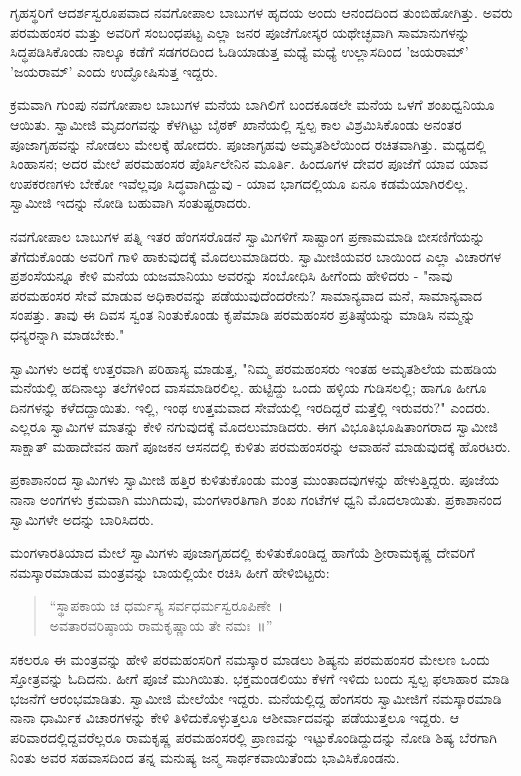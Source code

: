 ಗೃಹಸ್ಥರಿಗೆ ಆದರ್ಶಸ್ವರೂಪವಾದ ನವಗೋಪಾಲ ಬಾಬುಗಳ ಹೃದಯ ಅಂದು ಆನಂದದಿಂದ ತುಂಬಿಹೋಗಿತ್ತು. ಅವರು ಪರಮಹಂಸರ ಮತ್ತು ಅವರಿಗೆ ಸಂಬಂಧಪಟ್ಟ ಎಲ್ಲಾ ಜನರ ಪೂಜೆಗೋಸ್ಕರ ಯಥೇಚ್ಛವಾಗಿ ಸಾಮಾನುಗಳನ್ನು ಸಿದ್ಧಪಡಿಸಿಕೊಂಡು ನಾಲ್ಕೂ ಕಡೆಗೆ ಸಡಗರದಿಂದ ಓಡಿಯಾಡುತ್ತ ಮಧ್ಯೆ ಮಧ್ಯೆ ಉಲ್ಲಾಸದಿಂದ 'ಜಯರಾಮ್' 'ಜಯರಾಮ್' ಎಂದು ಉದ್ಘೋಷಿಸುತ್ತ ಇದ್ದರು.

ಕ್ರಮವಾಗಿ ಗುಂಪು ನವಗೋಪಾಲ ಬಾಬುಗಳ ಮನೆಯ ಬಾಗಿಲಿಗೆ ಬಂದಕೂಡಲೇ ಮನೆಯ ಒಳಗೆ ಶಂಖಧ್ವನಿಯೂ ಆಯಿತು. ಸ್ವಾಮೀಜಿ ಮೃದಂಗವನ್ನು ಕೆಳಗಿಟ್ಟು ಬೈಠಕ್ ಖಾನೆಯಲ್ಲಿ ಸ್ವಲ್ಪ ಕಾಲ ವಿಶ್ರಮಿಸಿಕೊಂಡು ಅನಂತರ ಪೂಜಾಗೃಹವನ್ನು ನೋಡಲು ಮೇಲಕ್ಕೆ ಹೋದರು. ಪೂಜಾಗೃಹವು ಅಮೃತಶಿಲೆಯಿಂದ ರಚಿತವಾಗಿತ್ತು. ಮಧ್ಯದಲ್ಲಿ ಸಿಂಹಾಸನ; ಅದರ ಮೇಲೆ ಪರಮಹಂಸರ ಪೊರ್ಸಿಲೇನಿನ ಮೂರ್ತಿ. ಹಿಂದೂಗಳ ದೇವರ ಪೂಜೆಗೆ ಯಾವ ಯಾವ ಉಪಕರಣಗಳು ಬೇಕೋ ಇವೆಲ್ಲವೂ ಸಿದ್ಧವಾಗಿದ್ದುವು - ಯಾವ ಭಾಗದಲ್ಲಿಯೂ ಏನೂ ಕಡಮೆಯಾಗಿರಲಿಲ್ಲ. ಸ್ವಾಮೀಜಿ ಇದನ್ನು ನೋಡಿ ಬಹುವಾಗಿ ಸಂತುಷ್ಟರಾದರು.

ನವಗೋಪಾಲ ಬಾಬುಗಳ ಪತ್ನಿ ಇತರ ಹೆಂಗಸರೊಡನೆ ಸ್ವಾಮಿಗಳಿಗೆ ಸಾಷ್ಟಾಂಗ ಪ್ರಣಾಮಮಾಡಿ ಬೀಸಣಿಗೆಯನ್ನು ತೆಗೆದುಕೊಂಡು ಅವರಿಗೆ ಗಾಳಿ ಹಾಕುವುದಕ್ಕೆ ಮೊದಲುಮಾಡಿದರು. ಸ್ವಾಮೀಜಿಯವರ ಬಾಯಿಂದ ಎಲ್ಲಾ ವಿಚಾರಗಳ ಪ್ರಶಂಸೆಯನ್ನೂ ಕೇಳಿ ಮನೆಯ ಯಜಮಾನಿಯು ಅವರನ್ನು ಸಂಬೋಧಿಸಿ ಹೀಗೆಂದು ಹೇಳಿದರು - "ನಾವು ಪರಮಹಂಸರ ಸೇವೆ ಮಾಡುವ ಅಧಿಕಾರವನ್ನು ಪಡೆಯುವುದೆಂದರೇನು? ಸಾಮಾನ್ಯವಾದ ಮನೆ, ಸಾಮಾನ್ಯವಾದ ಸಂಪತ್ತು. ತಾವು ಈ ದಿವಸ ಸ್ವಂತ ನಿಂತುಕೊಂಡು ಕೃಪೆಮಾಡಿ ಪರಮಹಂಸರ ಪ್ರತಿಷ್ಠೆಯನ್ನು ಮಾಡಿಸಿ ನಮ್ಮನ್ನು ಧನ್ಯರನ್ನಾಗಿ ಮಾಡಬೇಕು."

ಸ್ವಾಮಿಗಳು ಅದಕ್ಕೆ ಉತ್ತರವಾಗಿ ಪರಿಹಾಸ್ಯ ಮಾಡುತ್ತ, "ನಿಮ್ಮ ಪರಮಹಂಸರು ಇಂತಹ ಅಮೃತಶಿಲೆಯ ಮಹಡಿಯ ಮನೆಯಲ್ಲಿ ಹದಿನಾಲ್ಕು ತಲೆಗಳಿಂದ ವಾಸಮಾಡಿರಲಿಲ್ಲ. ಹುಟ್ಟಿದ್ದು ಒಂದು ಹಳ್ಳಿಯ ಗುಡಿಸಲಲ್ಲಿ; ಹಾಗೂ ಹೀಗೂ ದಿನಗಳನ್ನು ಕಳೆದದ್ದಾಯಿತು. ಇಲ್ಲಿ, ಇಂಥ ಉತ್ತಮವಾದ ಸೇವೆಯಲ್ಲಿ ಇರದಿದ್ದರೆ ಮತ್ತೆಲ್ಲಿ ಇರುವರು?" ಎಂದರು. ಎಲ್ಲರೂ ಸ್ವಾಮಿಗಳ ಮಾತನ್ನು ಕೇಳಿ ನಗುವುದಕ್ಕೆ ಮೊದಲುಮಾಡಿದರು. ಈಗ ವಿಭೂತಿಭೂಷಿತಾಂಗರಾದ ಸ್ವಾಮೀಜಿ ಸಾಕ್ಷಾತ್ ಮಹಾದೇವನ ಹಾಗೆ ಪೂಜಕನ ಆಸನದಲ್ಲಿ ಕುಳಿತು ಪರಮಹಂಸರನ್ನು ಆವಾಹನೆ ಮಾಡುವುದಕ್ಕೆ ಹೊರಟರು.

ಪ್ರಕಾಶಾನಂದ ಸ್ವಾಮಿಗಳು ಸ್ವಾಮೀಜಿ ಹತ್ತಿರ ಕುಳಿತುಕೊಂಡು ಮಂತ್ರ ಮುಂತಾದವುಗಳನ್ನು ಹೇಳುತ್ತಿದ್ದರು. ಪೂಜೆಯ ನಾನಾ ಅಂಗಗಳು ಕ್ರಮವಾಗಿ ಮುಗಿದುವು, ಮಂಗಳಾರತಿಗಾಗಿ ಶಂಖ ಗಂಟೆಗಳ ಧ್ವನಿ ಮೊದಲಾಯಿತು. ಪ್ರಕಾಶಾನಂದ ಸ್ವಾಮಿಗಳೇ ಅದನ್ನು ಬಾರಿಸಿದರು.

ಮಂಗಳಾರತಿಯಾದ ಮೇಲೆ ಸ್ವಾಮಿಗಳು ಪೂಜಾಗೃಹದಲ್ಲಿ ಕುಳಿತುಕೊಂಡಿದ್ದ ಹಾಗೆಯೆ ಶ‍್ರೀರಾಮಕೃಷ್ಣ ದೇವರಿಗೆ ನಮಸ್ಕಾರಮಾಡುವ ಮಂತ್ರವನ್ನು ಬಾಯಲ್ಲಿಯೇ ರಚಿಸಿ ಹೀಗೆ ಹೇಳಿಬಿಟ್ಟರು:

\begin{verse}
“ಸ್ಥಾಪಕಾಯ ಚ ಧರ್ಮಸ್ಯ ಸರ್ವಧರ್ಮಸ್ವರೂಪಿಣೇ~।\\ಅವತಾರವರಿಷ್ಠಾಯ ರಾಮಕೃಷ್ಣಾಯ ತೇ ನಮಃ~॥”
\end{verse}

ಸಕಲರೂ ಈ ಮಂತ್ರವನ್ನು ಹೇಳಿ ಪರಮಹಂಸರಿಗೆ ನಮಸ್ಕಾರ ಮಾಡಲು ಶಿಷ್ಯನು ಪರಮಹಂಸರ ಮೇಲಣ ಒಂದು ಸ್ತೋತ್ರವನ್ನು ಓದಿದನು. ಹೀಗೆ ಪೂಜೆ ಮುಗಿಯಿತು. ಭಕ್ತಮಂಡಲಿಯು ಕೆಳಗೆ ಇಳಿದು ಬಂದು ಸ್ವಲ್ಪ ಫಲಾಹಾರ ಮಾಡಿ ಭಜನೆಗೆ ಆರಂಭಮಾಡಿತು. ಸ್ವಾಮೀಜಿ ಮೇಲೆಯೇ ಇದ್ದರು. ಮನೆಯಲ್ಲಿದ್ದ ಹೆಂಗಸರು ಸ್ವಾಮೀಜಿಗೆ ನಮಸ್ಕಾರಮಾಡಿ ನಾನಾ ಧಾರ್ಮಿಕ ವಿಚಾರಗಳನ್ನು ಕೇಳಿ ತಿಳಿದುಕೊಳ್ಳುತ್ತಲೂ ಆಶೀರ್ವಾದವನ್ನು ಪಡೆಯುತ್ತಲೂ ಇದ್ದರು. ಆ ಪರಿವಾರದಲ್ಲಿದ್ದವರೆಲ್ಲರೂ ರಾಮಕೃಷ್ಣ ಪರಮಹಂಸರಲ್ಲಿ ಪ್ರಾಣವನ್ನು ಇಟ್ಟುಕೊಂಡಿದ್ದುದನ್ನು ನೋಡಿ ಶಿಷ್ಯ ಬೆರಗಾಗಿ ನಿಂತು ಅವರ ಸಹವಾಸದಿಂದ ತನ್ನ ಮನುಷ್ಯ ಜನ್ಮ ಸಾರ್ಥಕವಾಯಿತೆಂದು ಭಾವಿಸಿಕೊಂಡನು.

